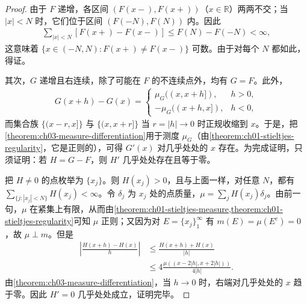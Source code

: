 \documentclass[../../main.tex]{subfiles}%
\begin{document}
\begin{proof}
由于 $F$ 递增，各区间 $(F(x-),F(x+))$（$x\in\mathbb{R}$）两两不交；当 $|x|<N$ 时，它们位于区间 $(F(-N),F(N))$ 内。因此
\begin{align*}
\sum_{|x|<N}[F(x+)-F(x-)]\le F(N)-F(-N)<\infty,
\end{align*}
这意味着 $\{x\in(-N,N):F(x+)\ne F(x-)\}$ 可数。由于对每个 $N$ 都如此，得证。

其次，$G$ 递增且右连续，除了可能在 $F$ 的不连续点外，均有 $G=F$。此外，
\begin{align*}
G(x+h)-G(x)=
\begin{cases}
\mu_G((x,x+h]),&h>0,\\
-\mu_G((x+h,x]),&h<0,
\end{cases}
\end{align*}
而集合族 $\{(x-r,x]\}$ 与 $\{(x,x+r]\}$ 当 $r=|h|\to0$ 时正规收缩到 $x$。于是，把\cref{theorem:ch03-measure-differentiation}用于测度 $\mu_G$（由\cref{theorem:ch01-stieltjes-regularity}，它是正则的），可得 $G'(x)$ 对几乎处处的 $x$ 存在。为完成证明，只须证明：若 $H=G-F$，则 $H'$ 几乎处处存在且等于零。

把 $H\ne0$ 的点枚举为 $\{x_j\}$。则 $H(x_j)>0$，且与上面一样，对任意 $N$，都有 $\sum_{\{j:|x_j|<N\}}H(x_j)<\infty$。令 $\delta_j$ 为 $x_j$ 处的点质量，$\mu=\sum_jH(x_j)\delta_j$。由前一句，$\mu$ 在紧集上有限，从而由\cref{theorem:ch01-stieltjes-measure,theorem:ch01-stieltjes-regularity}可知 $\mu$ 正则；又因为对 $E=\{x_j\}_1^\infty$ 有 $m(E)=\mu(E^c)=0$，故 $\mu\perp m$。但是
\begin{align*}
\left|\frac{H(x+h)-H(x)}h\right|
&\le\frac{H(x+h)+H(x)}{|h|}\\
&\le4\frac{\mu((x-2|h|,x+2|h|))}{4|h|}.
\end{align*}
由\cref{theorem:ch03-measure-differentiation}，当 $h\to0$ 时，右端对几乎处处的 $x$ 趋于零。因此 $H'=0$ 几乎处处成立，证明完毕。
\end{proof}
\end{document}
